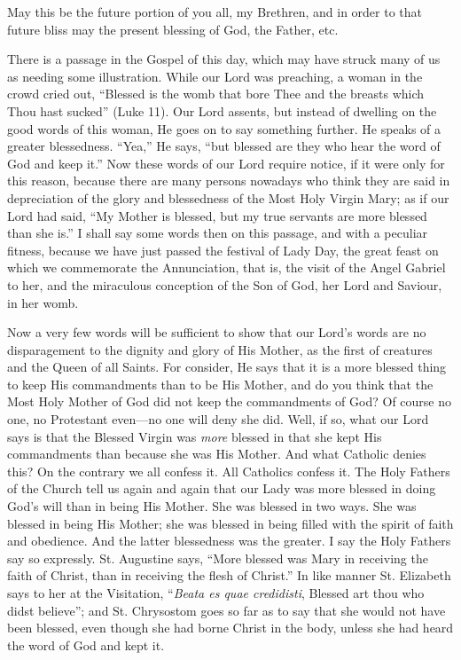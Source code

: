 May this be the future portion of you all, my
Brethren, and in order to that future bliss may the present blessing
of God, the Father, etc.



There is a passage in the Gospel of this
day, which may have struck many of us as needing some illustration.
While our Lord was preaching, a woman in the crowd cried out, ``Blessed
is the womb that bore Thee and the breasts which Thou hast sucked''
(Luke 11). Our Lord assents, but instead of dwelling on the good words
of this woman, He goes on to say something further. He speaks of a
greater blessedness. ``Yea,'' He says, ``but blessed are they who hear
the word of God and keep it.'' Now these words of our Lord require
notice, if it were only for this reason, because there are many
persons nowadays who think they are said in depreciation of the glory
and blessedness of the Most Holy Virgin Mary; as if our Lord had said,
``My Mother is blessed, but my true servants are more blessed than she
is.'' I shall say some words then on this passage, and with a peculiar
fitness, because we have just passed the festival of Lady Day, the
great feast on which we commemorate the Annunciation, that is,
the visit of the Angel Gabriel to her, and the miraculous conception
of the Son of God, her Lord and Saviour, in her womb.

Now a very few words will be sufficient to show
that our Lord's words are no disparagement to the dignity and glory of
His Mother, as the first of creatures and the Queen of all Saints. For
consider, He says that it is a more blessed thing to keep His
commandments than to be His Mother, and do you think that the Most
Holy Mother of God did not keep the commandments of God? Of course no
one, no Protestant even—no one will deny she did. Well, if so, what
our Lord says is that the Blessed Virgin was \emph{more} blessed in
that she kept His commandments than because she was His Mother. And
what Catholic denies this? On the contrary we all confess it. All
Catholics confess it. The Holy Fathers of the Church tell us again and
again that our Lady was more blessed in doing God's will than in being
His Mother. She was blessed in two ways. She was blessed in being His
Mother; she was blessed in being filled with the spirit of faith and
obedience. And the latter blessedness was the greater. I say the Holy
Fathers say so expressly. St. Augustine says, ``More blessed was
Mary in receiving the faith of Christ, than in receiving the flesh of
Christ.'' In like manner St. Elizabeth says to her at the Visitation,
``\emph{Beata es quae credidisti}, Blessed art thou who didst
believe''; and St. Chrysostom goes so far as to say that she would
not have been blessed, even though she had borne Christ in the body,
unless she had heard the word of God and kept it.

